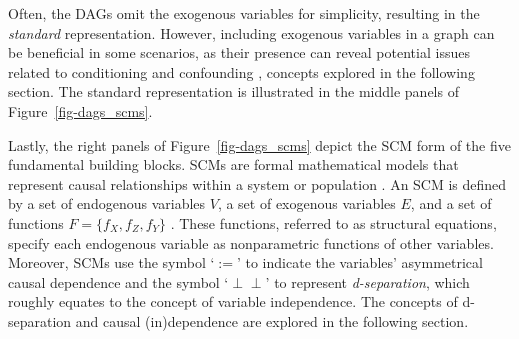 \documentclass[
  authoryear,
  preprint,
  1p]{elsarticle}
\begin{document}
Often, the DAGs omit the exogenous variables for simplicity, resulting
in the \emph{standard} representation. However, including exogenous
variables in a graph can be beneficial in some scenarios, as their
presence can reveal potential issues related to conditioning and
confounding \citep{Cinelli_et_al_2020}, concepts explored in the
following section. The standard representation is illustrated in the
middle panels of Figure~\ref{fig-dags_scms}.

\newcommand{\dsep}{\perp\!\!\!\perp}
\newcommand{\ndsep}{\not\!\perp\!\!\!\perp}

Lastly, the right panels of Figure~\ref{fig-dags_scms} depict the SCM
form of the five fundamental building blocks. SCMs are formal
mathematical models that represent causal relationships within a system
or population \citep{Hitchcock_2024}. An SCM is defined by a set of
endogenous variables \(V\), a set of exogenous variables \(E\), and a
set of functions \(F=\{f_{X},f_{Z},f_{Y}\}\)
\citep{Pearl_2009, Neal_2020}. These functions, referred to as
structural equations, specify each endogenous variable as nonparametric
functions of other variables. Moreover, SCMs use the symbol `\(:=\)' to
indicate the variables' asymmetrical causal dependence and the symbol
`\(\perp\!\!\!\perp\)' to represent \emph{d-separation}, which roughly
equates to the concept of variable independence. The concepts of
d-separation and causal (in)dependence are explored in the following
section.
\end{document}
